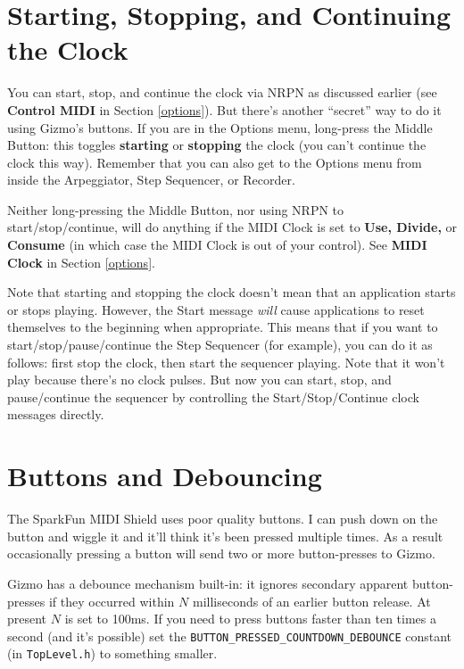 \documentclass{article}
\begin{document}
	\section{Starting, Stopping, and Continuing the Clock}
	\label{startingclock}

		You can start, stop, and continue the clock via NRPN as discussed earlier (see {\bf Control MIDI} in Section \ref{options}).   But there's another ``secret'' way to do it using Gizmo's buttons.  If you are in the Options menu, long-press the Middle Button: this toggles {\bf starting} or {\bf stopping} the clock (you can't continue the clock this way).  Remember that you can also get to the Options menu from inside the Arpeggiator, Step Sequencer, or Recorder.
		
		Neither long-pressing the Middle Button, nor using NRPN to start/stop/continue, will do anything if the MIDI Clock is set to {\bf Use, Divide,} or {\bf Consume} (in which case the MIDI Clock is out of your control).  See {\bf MIDI Clock} in Section \ref{options}.
				
		Note that starting and stopping the clock doesn't mean that an application starts or stops playing.  However, the Start message {\it will} cause applications to reset themselves to the beginning when appropriate.   This means that if you want to start/stop/pause/continue the Step Sequencer (for example), you can do it as follows: first stop the clock, then start the sequencer playing.  Note that it won't play because there's no clock pulses.  But now you can start, stop, and pause/continue the sequencer by controlling the Start/Stop/Continue clock messages directly.
		
\section{Buttons and Debouncing}

The SparkFun MIDI Shield uses poor quality buttons.  I can push down on the button and wiggle it and it'll think it's been pressed multiple times.  As a result occasionally pressing a button will send two or more button-presses to Gizmo.

Gizmo has a debounce mechanism built-in: it ignores secondary apparent button-presses if they occurred within \(N\) milliseconds of an earlier button release.  At present \(N\) is set to 100ms.  If you need to press buttons faster than ten times a second (and it's possible) set the \texttt{BUTTON\_PRESSED\_COUNTDOWN\_DEBOUNCE} constant (in \texttt{TopLevel.h}) to something smaller.
\end{document}
